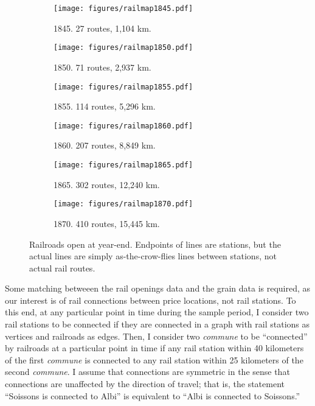 \documentclass[12pt,twoside]{article}
\begin{document}
\begin{figure}[p]
	\centering
	\begin{subfigure}[t]{0.45\textwidth}
		\centering
		\caption{1845. 27 routes, 1,104 km.}
		\texttt{[image: figures/railmap1845.pdf]}
	\end{subfigure}
	\begin{subfigure}[t]{0.45\textwidth}
		\centering
		\caption{1850. 71 routes, 2,937 km.}
		\texttt{[image: figures/railmap1850.pdf]}
	\end{subfigure}
	\begin{subfigure}[t]{0.45\textwidth}
		\centering
		\caption{1855. 114 routes, 5,296 km.}
		\texttt{[image: figures/railmap1855.pdf]}
	\end{subfigure}
	\begin{subfigure}[t]{0.45\textwidth}
		\centering
		\caption{1860. 207 routes, 8,849 km.}
		\texttt{[image: figures/railmap1860.pdf]}
	\end{subfigure}
	\begin{subfigure}[t]{0.45\textwidth}
		\centering
		\caption{1865. 302 routes, 12,240 km.}
		\texttt{[image: figures/railmap1865.pdf]}
	\end{subfigure}
	\begin{subfigure}[t]{0.45\textwidth}
		\centering
		\caption{1870. 410 routes, 15,445 km.}
		\texttt{[image: figures/railmap1870.pdf]}
	\end{subfigure}
	\caption{Railroads open at year-end. Endpoints of lines are stations, but the actual lines are simply as-the-crow-flies lines between stations, not actual rail routes.}
	\label{fig:rail_openings}
\end{figure}

Some matching betweeen the rail openings data and the grain data is required, as our interest is of rail connections between price locations, not rail stations.
To this end, at any particular point in time during the sample period, I consider two rail stations to be connected if they are connected in a graph with rail stations as vertices and railroads as edges.
Then, I consider two \emph{commune} to be ``connected'' by railroads at a particular point in time if any rail station within 40 kilometers of the first \emph{commune} is connected to any rail station within 25 kilometers of the second \emph{commune}.
I assume that connections are symmetric in the sense that connections are unaffected by the direction of travel; that is, the statement ``Soissons is connected to Albi'' is equivalent to ``Albi is connected to Soissons.''
\end{document}
